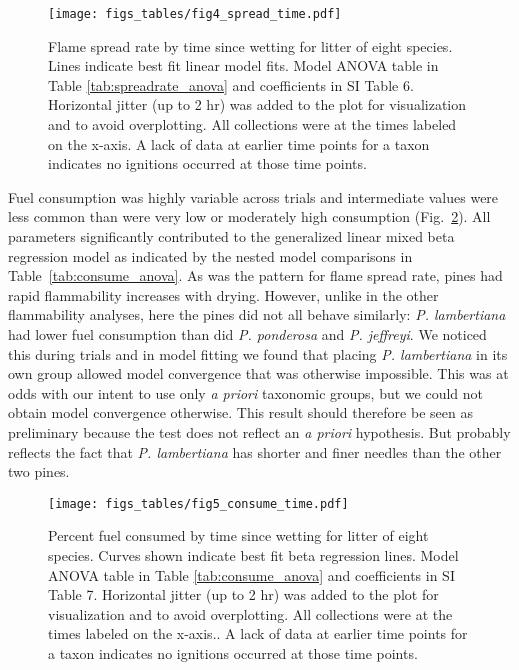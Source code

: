 \documentclass[letterpaper,12pt]{article}
\begin{document}
\begin{figure}[h]
  \centering
\texttt{[image: figs\_tables/fig4\_spread\_time.pdf]}
\caption{Flame spread rate by time since wetting for litter of eight species.
  Lines indicate best fit linear model fits. Model ANOVA table in Table
  \ref{tab:spreadrate_anova} and coefficients in SI Table 6. Horizontal jitter
  (up to 2 hr) was added to the plot for visualization and to avoid
  overplotting. All collections were at the times labeled on the x-axis. A lack
  of data at earlier time points for a taxon indicates no ignitions occurred at
  those time points.}
\label{fig:spread_time}
\end{figure}

Fuel consumption was highly variable across trials and intermediate values were
less common than were very low or moderately high consumption
(Fig.~\ref{fig:consume_time}). All parameters significantly contributed to the
generalized linear mixed beta regression model as indicated by the nested model
comparisons in Table~\ref{tab:consume_anova}. As was the pattern for flame
spread rate, pines had rapid flammability increases with drying. However,
unlike in the other flammability analyses, here the pines did not all behave
similarly: \emph{P. lambertiana} had lower fuel consumption than did \emph{P.
  ponderosa} and \emph{P. jeffreyi}. We noticed this during trials and in model
fitting we found that placing \emph{P. lambertiana} in its own group allowed
model convergence that was otherwise impossible. This was at odds with our
intent to use only \emph{a priori} taxonomic groups, but we could not obtain
model convergence otherwise. This result should therefore be seen as
preliminary because the test does not reflect an \emph{a priori} hypothesis.
But probably reflects the fact that \emph{P. lambertiana} has shorter and finer
needles than the other two pines.


\begin{figure}[h]
  \centering
\texttt{[image: figs\_tables/fig5\_consume\_time.pdf]}
\caption{Percent fuel consumed by time since wetting for litter of eight
  species. Curves shown indicate best fit beta regression lines. Model ANOVA
  table in Table \ref{tab:consume_anova} and coefficients in SI Table 7.
  Horizontal jitter (up to 2 hr) was added to the plot for visualization and to
  avoid overplotting. All collections were at the times labeled on the x-axis..
  A lack of data at earlier time points for a taxon indicates no ignitions
  occurred at those time points.}
  \label{fig:consume_time}
\end{figure}
\end{document}

